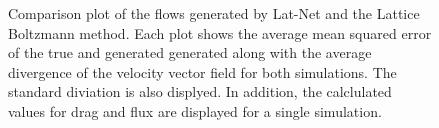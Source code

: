 \documentclass{article}
\begin{document}
\begin{figure}[!t]
\caption{ Comparison plot of the flows generated by Lat-Net and the Lattice Boltzmann method. Each plot shows the average mean squared error of the true and generated generated along with the average divergence of the velocity vector field for both simulations. The standard diviation is also displyed. In addition, the calclulated values for drag and flux are displayed for a single simulation.}
\label{2d_error_plot}
\end{figure}
\end{document}
